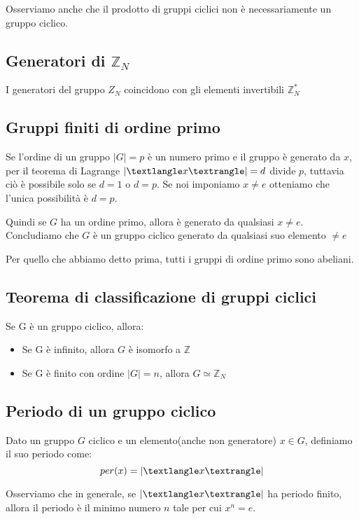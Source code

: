 \documentclass[a4paper, 10pt]{article}
\begin{document}
Osserviamo anche che il prodotto di gruppi ciclici non è necessariamente un gruppo ciclico.

\subsection{Generatori di $\mathbb{Z}_N$}

I generatori del gruppo $Z_N$ coincidono con gli elementi invertibili $\mathbb{Z}_N^*$

\subsection{Gruppi finiti di ordine primo}

Se l'ordine di un gruppo $|G|=p$ è un numero primo e il gruppo è generato da $x$, per il teorema di Lagrange $|\textlangle x \textrangle| = d$ divide $p$, tuttavia ciò è possibile solo se $d = 1$ o $d = p$. Se noi imponiamo $x \neq e$ otteniamo che l'unica possibilità è $d = p$. 

Quindi se $G$ ha un ordine primo, allora è generato da qualsiasi $x \neq e$. Concludiamo che $G$ è un gruppo ciclico generato da qualsiasi suo elemento $\neq e$

Per quello che abbiamo detto prima, tutti i gruppi di ordine primo sono abeliani.
\subsection{Teorema di classificazione di gruppi ciclici}

Se G è un gruppo ciclico, allora:

\begin{itemize}
	\item Se G è infinito, allora $G$ è isomorfo a $\mathbb{Z}$
	\item Se G è finito con ordine $|G| = n$, allora $G \simeq \mathbb{Z}_N$
\end{itemize}

\subsection{Periodo di un gruppo ciclico}

Dato un gruppo $G$ ciclico e un elemento(anche non generatore) $x \in G$, definiamo il suo periodo come: $$per(x) = |\textlangle x \textrangle|$$

Osserviamo che in generale, se $|\textlangle x \textrangle|$ ha periodo finito, allora il periodo è il minimo numero $n$ tale per cui $x^n = e$.
\end{document}
